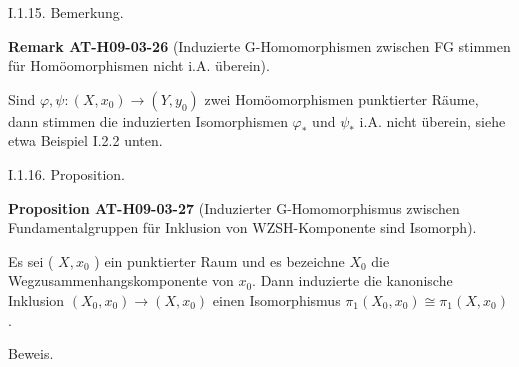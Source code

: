 \documentclass[10pt, letterpaper]{article}
\newcommand{\CustomHeading}[3]{%
  \par\medskip\noindent%
  \textbf{#1 #2} \textnormal{(#3)}.\enskip%
}
\newenvironment{PROP}[2]{\begin{unitbox}\CustomHeading{Proposition}{#1}{#2}}{\end{unitbox}}
\newenvironment{REM}[2]{\begin{unitbox}\CustomHeading{Remark}{#1}{#2}}{\end{unitbox}}
\begin{document}
I.1.15. Bemerkung. 


\begin{REM}{AT-H09-03-26}{Induzierte G-Homomorphismen zwischen FG stimmen für Homöomorphismen nicht i.A. überein}
Sind $\varphi, \psi:\left(X, x_{0}\right) \rightarrow\left(Y, y_{0}\right)$ zwei Homöomorphismen punktierter Räume, dann stimmen die induzierten Isomorphismen $\varphi_{*}$ und $\psi_{*}$ i.A. nicht überein, siehe etwa Beispiel I.2.2 unten.
\end{REM}


I.1.16. Proposition. 

\begin{PROP}{AT-H09-03-27}{Induzierter G-Homomorphismus zwischen Fundamentalgruppen für Inklusion von WZSH-Komponente sind Isomorph}
Es sei ( $X, x_{0}$ ) ein punktierter Raum und es bezeichne $X_{0}$ die Wegzusammenhangskomponente von $x_{0}$. Dann induzierte die kanonische Inklusion $\left(X_{0}, x_{0}\right) \rightarrow\left(X, x_{0}\right)$ einen Isomorphismus $\pi_{1}\left(X_{0}, x_{0}\right) \cong \pi_{1}\left(X, x_{0}\right)$.
\end{PROP}

Beweis. 
\end{document}
